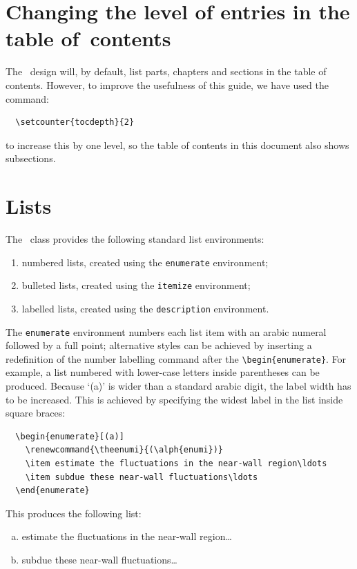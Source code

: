 \section{Changing the level of entries in the table of~contents}
\label{changingentries}
The \cambridge\ design will, by default, list parts, chapters and sections in the table of contents. However, to improve the usefulness of this guide, we have used the command:
\begin{verbatim}
  \setcounter{tocdepth}{2}
\end{verbatim}
to increase this by one level, so the table of contents in this document also shows subsections.


\section{Lists}
\label{lists}

The \cambridge\ class provides the following standard list environments:
\begin{enumerate}
 \item numbered lists, created using the \verb"enumerate" environment;
 \item bulleted lists, created using the \verb"itemize" environment;
 \item labelled lists, created using the \verb"description" environment.
\end{enumerate}
The \verb"enumerate" environment numbers each list item with an arabic numeral followed by a full point; alternative styles can be achieved by inserting a redefinition of the number labelling command after the \verb"\begin{enumerate}". For example, a list numbered with lower-case letters inside parentheses can be produced. Because `(a)' is wider than a standard arabic digit, the label width has to be increased. This is achieved by specifying the widest label in the list inside square braces:
\begin{verbatim}
  \begin{enumerate}[(a)]
    \renewcommand{\theenumi}{(\alph{enumi})}
    \item estimate the fluctuations in the near-wall region\ldots
    \item subdue these near-wall fluctuations\ldots
  \end{enumerate}
\end{verbatim}
This produces the following list:
  \begin{enumerate}[(a)]
    \renewcommand{\theenumi}{(\alph{enumi})}
    \item estimate the fluctuations in the near-wall region\ldots
    \item subdue these near-wall fluctuations\ldots
  \end{enumerate}



